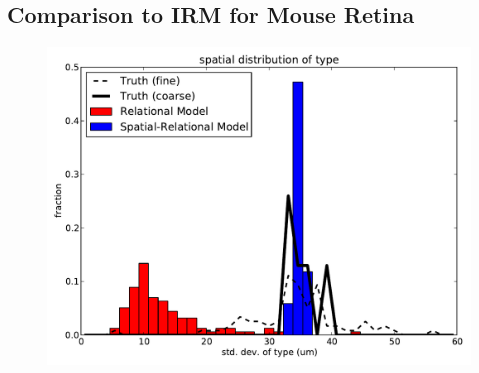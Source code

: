 \documentclass{article}
\begin{document}


\FloatBarrier
\subsection{Comparison to IRM for Mouse Retina}

\begin{figure}[h!]
  \centering 
    \centerline{\includegraphics[width=5in]{mouseretina/spatial_var.pdf}}
  \caption{}
\label{fig:supp:irmspatialcomparemouse}
\end{figure}
\end{document}
